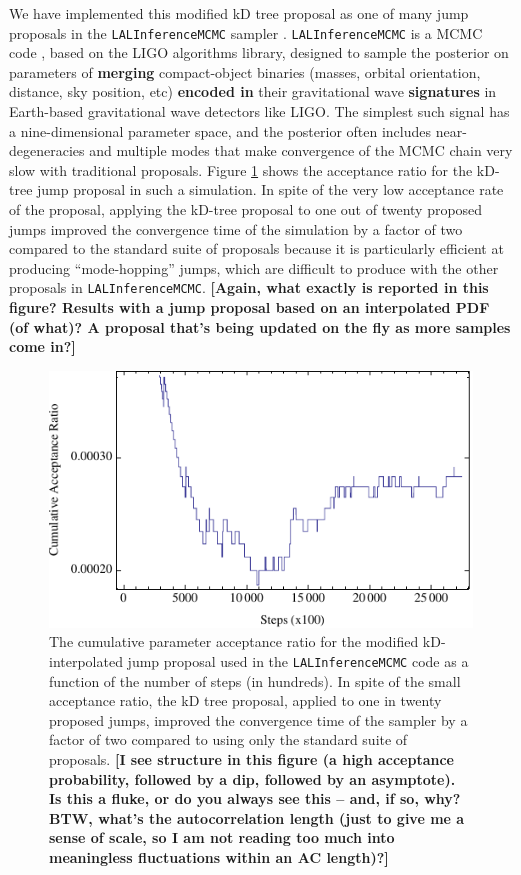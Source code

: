 \documentclass{iopart}
\newcommand{\ilya}[1]{{\color{red} \bf #1}}
\begin{document}
We have implemented this modified kD tree proposal as one of many jump
proposals in the \texttt{LALInferenceMCMC} sampler
\cite{vanderSluys:2008a,Raymond:2010,Raymond2012}.
\texttt{LALInferenceMCMC} is a MCMC code \cite{lalinf_method}, based on the LIGO algorithms
library, designed to sample the posterior on parameters of \ilya{merging}
compact-object binaries (masses, orbital orientation, distance, sky
position, etc) \ilya{encoded in} their gravitational wave \ilya{signatures} in
Earth-based gravitational wave detectors like LIGO.  The simplest such
signal has a nine-dimensional parameter space, and the posterior often
includes near-degeneracies and multiple modes that make convergence of
the MCMC chain very slow with traditional proposals.  Figure
\ref{fig:accratio} shows the acceptance ratio for the kD-tree jump
proposal in such a simulation.  In spite of the very low acceptance
rate of the proposal, applying the kD-tree proposal to one out of
twenty proposed jumps improved the convergence time of the simulation
by a factor of two compared to the standard suite of proposals because
it is particularly efficient at producing ``mode-hopping'' jumps,
which are difficult to produce with the other proposals in
\texttt{LALInferenceMCMC}.  \ilya{[Again, what exactly is reported in this figure?  Results with a jump proposal based on an interpolated PDF (of what)?  A proposal that's being updated on the fly as more samples come in?]}

\begin{figure}
  \begin{center}
    \includegraphics[width=0.8\columnwidth]{linearlog3}
  \end{center}
  \caption{\label{fig:accratio} The cumulative parameter acceptance
    ratio for the modified kD-interpolated jump proposal used in the
    \texttt{LALInferenceMCMC} code as a function of the number of
    steps (in hundreds). In spite of the small acceptance ratio, the
    kD tree proposal, applied to one in twenty proposed jumps,
    improved the convergence time of the sampler by a factor of two
    compared to using only the standard suite of proposals. \ilya{[I see structure in this figure (a high acceptance probability, followed by a dip, followed by an asymptote).  Is this a fluke, or do you always see this -- and, if so, why?  BTW, what's the autocorrelation length (just to give me a sense of scale, so I am not reading too much into meaningless fluctuations within an AC length)?]}}
\end{figure}
\end{document}
